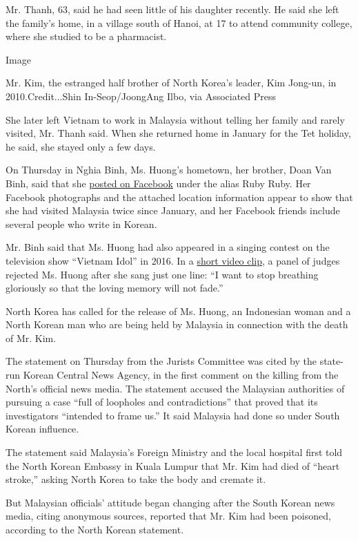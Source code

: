 Mr. Thanh, 63, said he had seen little of his daughter recently. He said
she left the family's home, in a village south of Hanoi, at 17 to attend
community college, where she studied to be a pharmacist.

Image

Mr. Kim, the estranged half brother of North Korea's leader, Kim
Jong-un, in 2010.Credit...Shin In-Seop/JoongAng Ilbo, via Associated
Press

She later left Vietnam to work in Malaysia without telling her family
and rarely visited, Mr. Thanh said. When she returned home in January
for the Tet holiday, he said, she stayed only a few days.

On Thursday in Nghia Binh, Ms. Huong's hometown, her brother, Doan Van
Binh, said that she
\href{https://www.facebookcorewwwi.onion/profile.php?id=100014435959215\&lst=698293796\%253A100014435959215\%253A1487826179}{posted
on Facebook} under the alias Ruby Ruby. Her Facebook photographs and the
attached location information appear to show that she had visited
Malaysia twice since January, and her Facebook friends include several
people who write in Korean.

Mr. Binh said that Ms. Huong had also appeared in a singing contest on
the television show ``Vietnam Idol'' in 2016. In a
\href{http://www.youtube.com/watch?v=vZNqVandYLA}{short video clip}, a
panel of judges rejected Ms. Huong after she sang just one line: ``I
want to stop breathing gloriously so that the loving memory will not
fade.''

North Korea has called for the release of Ms. Huong, an Indonesian woman
and a North Korean man who are being held by Malaysia in connection with
the death of Mr. Kim.

The statement on Thursday from the Jurists Committee was cited by the
state-run Korean Central News Agency, in the first comment on the
killing from the North's official news media. The statement accused the
Malaysian authorities of pursuing a case ``full of loopholes and
contradictions'' that proved that its investigators ``intended to frame
us.'' It said Malaysia had done so under South Korean influence.

The statement said Malaysia's Foreign Ministry and the local hospital
first told the North Korean Embassy in Kuala Lumpur that Mr. Kim had
died of ``heart stroke,'' asking North Korea to take the body and
cremate it.

But Malaysian officials' attitude began changing after the South Korean
news media, citing anonymous sources, reported that Mr. Kim had been
poisoned, according to the North Korean statement.

